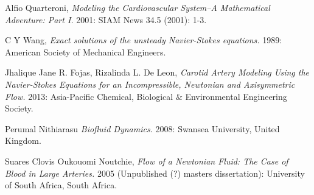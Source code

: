 \documentclass[12pt, a4paper]{article}
\theoremstyle{plain}
\theoremstyle{definition}
\theoremstyle{remark}
\begin{document}













\newpage


 \begin{thebibliography}{1}
  Alfio Quarteroni, {\em Modeling the Cardiovascular System--A Mathematical Adventure: Part I.} 2001: SIAM News 34.5 (2001): 1-3.

   C Y Wang, {\em Exact solutions of the unsteady Navier-Stokes equations.} 1989: American Society of Mechanical Engineers.

    Jhalique Jane R. Fojas, Rizalinda L. De Leon, {\em Carotid Artery Modeling Using the Navier-Stokes Equations for an Incompressible, Newtonian and Axisymmetric Flow.} 2013: Asia-Pacific Chemical, Biological $\&$ Environmental Engineering Society.


   Perumal Nithiarasu {\em Biofluid Dynamics.} 2008: Swansea University, United Kingdom.

   Suares Clovis Oukouomi Noutchie, {\em Flow of a Newtonian Fluid: The Case of Blood in Large Arteries.} 2005 (Unpublished (?) masters dissertation): University of South Africa, South Africa.

  \end{thebibliography}
\end{document}
